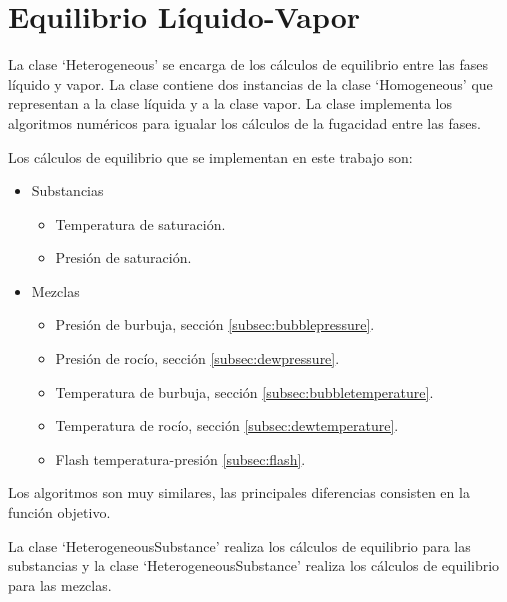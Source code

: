 \section{Equilibrio Líquido-Vapor}\label{sec:heterogeneous}

	La clase `Heterogeneous' se encarga de los cálculos de equilibrio entre las fases líquido y vapor. La clase contiene dos instancias de la clase `Homogeneous' que representan a la clase líquida y a la clase vapor. La clase implementa los algoritmos numéricos para igualar los cálculos de la fugacidad entre las fases.

	Los cálculos de equilibrio que se implementan en este trabajo son:

	\begin{itemize}

		\item Substancias
			\begin{itemize}
				\item Temperatura de saturación.
				\item Presión de saturación.
			\end{itemize}

		\item Mezclas
	\begin{itemize}
		\item Presión de burbuja, sección \ref{subsec:bubblepressure}.
		\item Presión de rocío, sección \ref{subsec:dewpressure}.
		\item Temperatura de burbuja, sección \ref{subsec:bubbletemperature}.
		\item Temperatura de rocío, sección \ref{subsec:dewtemperature}.
		\item Flash temperatura-presión \ref{subsec:flash}.
	\end{itemize}

	\end{itemize}

	Los algoritmos son muy similares, las principales diferencias consisten en la función objetivo.

	La clase `HeterogeneousSubstance' realiza los cálculos de equilibrio para las substancias y la clase `HeterogeneousSubstance' realiza los cálculos de equilibrio para las mezclas.